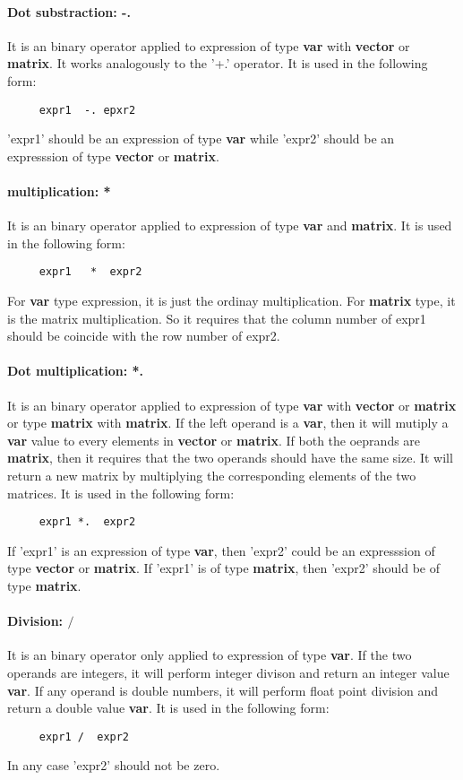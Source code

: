 \documentclass[12pt]{article} %
\begin{document}
\paragraph{Dot substraction: -. }
It is an binary operator applied to expression of type  \textbf{var} with \textbf{vector} or \textbf{matrix}.  It works analogously to the '+.' operator. It is used in the following form: 
\begin{lstlisting}
     expr1  -. epxr2
\end{lstlisting}
'expr1' should be an expression of type  \textbf{var} while 'expr2' should be an expresssion of type  \textbf{vector} or  \textbf{matrix}.

\paragraph{multiplication: *}
It is an binary operator applied to expression of type \textbf{var}  and  \textbf{matrix}.  It is used in the following form:
\begin{lstlisting}
     expr1   *  expr2
\end{lstlisting}
For \textbf{var} type expression, it  is just the ordinay multiplication. For \textbf{matrix}  type,  it is the matrix multiplication. So it requires that the column number of expr1 should be coincide with the row number of expr2.
 
\paragraph{Dot multiplication: *.}
It is an binary operator applied to expression of type  \textbf{var} with \textbf{vector} or \textbf{matrix} or type \textbf{matrix} with \textbf{matrix}. If the left operand is a  \textbf{var}, then  it will  mutiply a \textbf{var} value to every elements in \textbf{vector}  or  \textbf{matrix}. If both the oeprands are  \textbf{matrix}, then it  requires that the two operands should have the same size. It will return a new matrix  by multiplying the corresponding elements of the two matrices. It is used in the following form: 
\begin{lstlisting}
     expr1 *.  expr2
\end{lstlisting}
If 'expr1' is an expression of type  \textbf{var}, then 'expr2' could be an expresssion of type  \textbf{vector} or  \textbf{matrix}. If 'expr1' is of type  \textbf{matrix}, then 'expr2' should be of type  \textbf{matrix}.

\paragraph{Division: $/$ }
It is an binary operator only  applied to expression of type \textbf{var}. If  the two operands are integers, it will perform integer divison and return an integer value \textbf{var}. If any operand is double numbers, it will perform float point division and return a double  value   \textbf{var}.  It is used in the following form:
\begin{lstlisting}
     expr1 /  expr2
\end{lstlisting}
In any case  'expr2' should not be zero.
\end{document}
